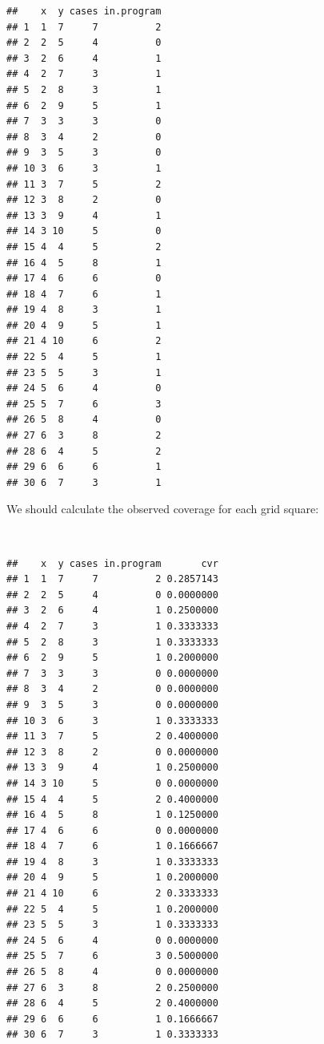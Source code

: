 \documentclass[12pt,a4paper]{book}
\newenvironment{Shaded}{\begin{snugshade}}{\end{snugshade}}
\newcommand{\StringTok}[1]{\textcolor[rgb]{0.31,0.60,0.02}{#1}}
\newcommand{\OperatorTok}[1]{\textcolor[rgb]{0.81,0.36,0.00}{\textbf{#1}}}
\newcommand{\NormalTok}[1]{#1}
\theoremstyle{definition}
\theoremstyle{definition}
\theoremstyle{definition}
\theoremstyle{remark}
\begin{document}
\begin{verbatim}
##    x  y cases in.program
## 1  1  7     7          2
## 2  2  5     4          0
## 3  2  6     4          1
## 4  2  7     3          1
## 5  2  8     3          1
## 6  2  9     5          1
## 7  3  3     3          0
## 8  3  4     2          0
## 9  3  5     3          0
## 10 3  6     3          1
## 11 3  7     5          2
## 12 3  8     2          0
## 13 3  9     4          1
## 14 3 10     5          0
## 15 4  4     5          2
## 16 4  5     8          1
## 17 4  6     6          0
## 18 4  7     6          1
## 19 4  8     3          1
## 20 4  9     5          1
## 21 4 10     6          2
## 22 5  4     5          1
## 23 5  5     3          1
## 24 5  6     4          0
## 25 5  7     6          3
## 26 5  8     4          0
## 27 6  3     8          2
## 28 6  4     5          2
## 29 6  6     6          1
## 30 6  7     3          1
\end{verbatim}

\newpage

We should calculate the observed coverage for each grid square:

~

\begin{Shaded}
\end{Shaded}

\begin{verbatim}
##    x  y cases in.program       cvr
## 1  1  7     7          2 0.2857143
## 2  2  5     4          0 0.0000000
## 3  2  6     4          1 0.2500000
## 4  2  7     3          1 0.3333333
## 5  2  8     3          1 0.3333333
## 6  2  9     5          1 0.2000000
## 7  3  3     3          0 0.0000000
## 8  3  4     2          0 0.0000000
## 9  3  5     3          0 0.0000000
## 10 3  6     3          1 0.3333333
## 11 3  7     5          2 0.4000000
## 12 3  8     2          0 0.0000000
## 13 3  9     4          1 0.2500000
## 14 3 10     5          0 0.0000000
## 15 4  4     5          2 0.4000000
## 16 4  5     8          1 0.1250000
## 17 4  6     6          0 0.0000000
## 18 4  7     6          1 0.1666667
## 19 4  8     3          1 0.3333333
## 20 4  9     5          1 0.2000000
## 21 4 10     6          2 0.3333333
## 22 5  4     5          1 0.2000000
## 23 5  5     3          1 0.3333333
## 24 5  6     4          0 0.0000000
## 25 5  7     6          3 0.5000000
## 26 5  8     4          0 0.0000000
## 27 6  3     8          2 0.2500000
## 28 6  4     5          2 0.4000000
## 29 6  6     6          1 0.1666667
## 30 6  7     3          1 0.3333333
\end{verbatim}
\end{document}
